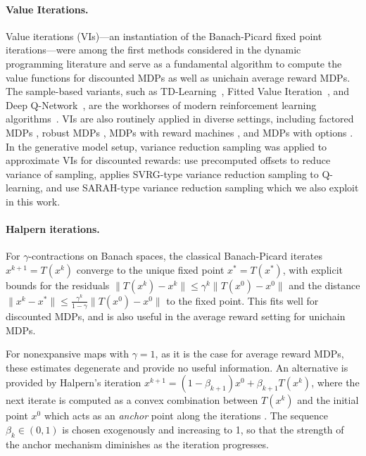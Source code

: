 \paragraph{Value Iterations.}
Value iterations (VIs)---an instantiation of the Banach-Picard fixed point iterations---were among the first methods considered in the dynamic programming literature \citep{bellman1957markovian} and serve as a fundamental algorithm to compute the value functions for discounted MDPs as well as unichain average reward MDPs. The sample-based variants, such as TD-Learning~\citep{Sutton1988}, Fitted Value Iteration~\citep{Ernst05,Munos08JMLR}, and Deep Q-Network~\citep{MnihKavukcuogluSilveretal2015}, are the workhorses of modern reinforcement learning algorithms~\citep{Bertsekas96,sutton2018reinforcement,SzepesvariBook10}. VIs are also routinely applied in diverse settings, including factored MDPs \citep{rosenberg2021oracle}, robust MDPs \citep{kumarefficient}, MDPs with reward machines \citep{bourel2023exploration}, and MDPs with options \citep{fruit2017regret}. In the generative model setup, variance reduction sampling was applied to approximate VIs for discounted rewards: \citet{sidford2023variance, sidford2018near} use precomputed offsets to reduce variance of sampling, \citet{wainwright2019variance} applies SVRG-type variance reduction sampling \cite{johnson2013accelerating} to Q-learning, and \citet{jin2024truncated} use SARAH-type variance reduction sampling \citep{nguyen2017sarah} which we also exploit in this work.

\paragraph{Halpern iterations.}
For $\gamma$-contractions on Banach spaces,  the classical Banach-Picard iterates $x^{k+1}=T(x^{k})$ converge to the unique fixed point $x^*=T(x^*)$, with explicit bounds for the residuals $\|T(x^k)-x^k\|\leq \gamma^k\|T(x^0)-x^0\|$
and the distance 
$\|x^k-x^*\|\leq \frac{\gamma^k}{1-\gamma}\|T(x^0)-x^0\|$ to the fixed point. This fits well for discounted MDPs, and is also useful in the average reward setting for unichain MDPs. 

For nonexpansive maps with $\gamma=1$, as it is the  case for average reward MDPs, these estimates degenerate and provide no useful information. 
An alternative is provided by Halpern's iteration $x^{k+1}\!=\!(1-\beta_{k+1})x^0+\beta_{k+1} T(x^{k})$, where the next iterate is computed as a convex combination between $T(x^{k})$ and the initial point $x^0$ which acts as an {\em anchor} point along the iterations \citep{halpern1967fixed}. The sequence
$\beta_k\in (0,1)$ is chosen exogenously and increasing to 1, so that the strength of the anchor mechanism diminishes as the iteration progresses. 

